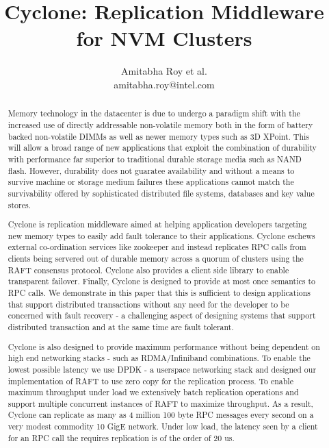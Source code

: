 \documentclass[twocolumn]{article}
\begin{document}
\title{Cyclone: Replication Middleware for NVM Clusters}
\author{Amitabha Roy et al. \\ amitabha.roy@intel.com}
\maketitle
\begin{abstract}
Memory technology in the datacenter is due to undergo a paradigm shift with the
increased use of directly addressable non-volatile memory both in the form of
battery backed non-volatile DIMMs as well as newer memory types such as
3D XPoint. This will allow a broad range of new applications that exploit the
combination of durability with performance far superior to traditional durable
storage media such as NAND flash. However, durability does not guaratee
availability and without a means to survive machine or storage medium failures
these applications cannot match the survivability offered by sophisticated
distributed file systems, databases and key value stores.

Cyclone is replication middleware aimed at helping application developers
targeting new memory types to easily add fault tolerance to their
applications. Cyclone eschews external co-ordination services like zookeeper and
instead replicates RPC calls from clients being servered out of durable memory
across a quorum of clusters using the RAFT consensus protocol. Cyclone also
provides a client side library to enable transparent failover. Finally, Cyclone
is designed to provide at most once semantics to RPC calls. We demonstrate in
this paper that this is sufficient to design applications that support
distributed transactions without any need for the developer to be concerned with
fault recovery - a challenging aspect of designing systems that support
distributed transaction and at the same time are fault tolerant.

Cyclone is also designed to provide maximum performance without being dependent
on high end networking stacks - such as RDMA/Infiniband combinations.  To enable
the lowest possible latency we use DPDK - a userspace networking stack and
designed our implementation of RAFT to use zero copy for the replication
process. To enable maximum throughput under load we extensively batch
replication operations and support multiple concurrent instances of RAFT to
maximize throughput. As a result, Cyclone can replicate as many as 4 million 100
byte RPC messages every second on a very modest commodity 10 GigE network. Under
low load, the latency seen by a client for an RPC call the requires replication
is of the order of 20 us.
\end{abstract}  
\end{document}
